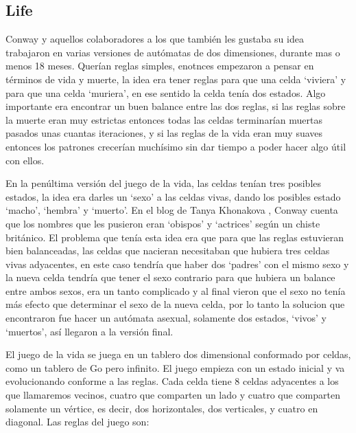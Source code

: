 \subsection{Life}

\label{subsection:life-explain}

Conway y aquellos colaboradores a los que tambi\'en les gustaba su idea trabajaron en varias versiones de aut\'omatas de dos dimensiones, durante mas o menos 18 meses. Quer\'ian reglas simples, enotnces empezaron a pensar en t\'erminos de vida y muerte, la idea era tener reglas para que una celda `viviera' y para que una celda `muriera', en ese sentido la celda ten\'ia dos estados. Algo importante era encontrar un buen balance entre las dos reglas, si las reglas sobre la muerte eran muy estrictas entonces todas las celdas terminar\'ian muertas pasados unas cuantas iteraciones, y si las reglas de la vida eran muy suaves entonces los patrones crecer\'ian much\'isimo sin dar tiempo a poder hacer algo \'util con ellos.

En la pen\'ultima versi\'on del juego de la vida, las celdas ten\'ian tres posibles estados, la idea era darles un `sexo' a las celdas vivas, dando los posibles estado `macho', `hembra' y `muerto'. En el blog de Tanya Khonakova \cite{blog:tanyakhovanova}, Conway cuenta que los nombres que les pusieron eran `obispos' y `actrices' seg\'un un chiste brit\'anico. El problema que ten\'ia esta idea era que para que las reglas estuvieran bien balanceadas, las celdas que nacieran necesitaban que hubiera tres celdas vivas adyacentes, en este caso tendr\'ia que haber dos `padres' con el mismo sexo y la nueva celda tendr\'ia que tener el sexo contrario para que hubiera un balance entre ambos sexos, era un tanto complicado y al final vieron que el sexo no ten\'ia m\'as efecto que determinar el sexo de la nueva celda, por lo tanto la solucion que encontraron fue hacer un aut\'omata asexual, solamente dos estados, `vivos' y `muertos', as\'i llegaron a la versi\'on final.

El juego de la vida se juega en un tablero dos dimensional conformado por celdas, como un tablero de Go pero infinito. El juego empieza con un estado inicial y va evolucionando conforme a las reglas. Cada celda tiene 8 celdas adyacentes a los que llamaremos vecinos, cuatro que comparten un lado y cuatro que comparten solamente un v\'ertice, es decir, dos horizontales, dos verticales, y cuatro en diagonal. Las reglas del juego son:

